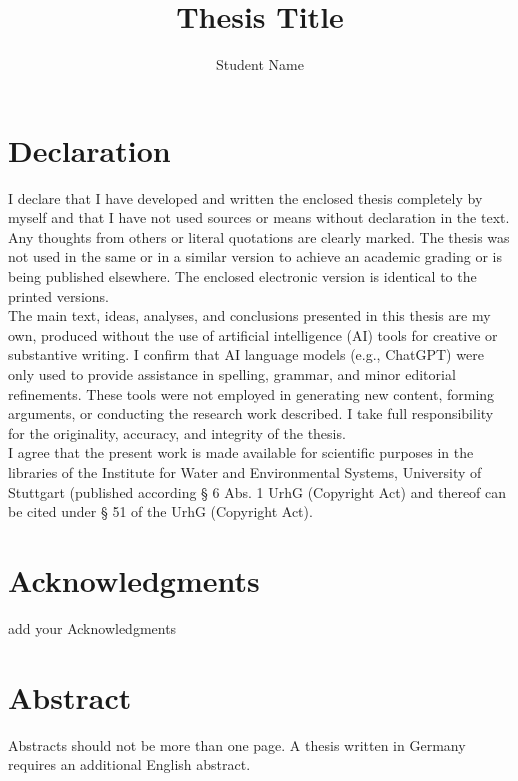 \documentclass[11pt,twoside]{thesis}
\title{\textbf{Thesis Title}} %
\author{Student Name} %
\begin{document}


\newpage\null\thispagestyle{empty}\newpage


\chapter*{Declaration}
{
	I declare that I have developed and written the enclosed thesis completely by myself and that I have not used sources or means without declaration in the text. Any thoughts from others or literal quotations are clearly marked. The thesis was not used in the same or in a similar version to achieve an academic grading or is being published elsewhere. The enclosed electronic version is identical to the printed versions.\\
	
	The main text, ideas, analyses, and conclusions presented in this thesis are my own, produced without the use of artificial intelligence (AI) tools for creative or substantive writing. I confirm that AI language models (e.g., ChatGPT) were only used to provide assistance in spelling, grammar, and minor editorial refinements. These tools were not employed in generating new content, forming arguments, or conducting the research work described. I take full responsibility for the originality, accuracy, and integrity of the thesis.\\ 
	
	I agree that the present work is made available for scientific purposes in the libraries of the Institute for Water and Environmental Systems, University of Stuttgart (published according § 6 Abs. 1 UrhG (Copyright Act) and thereof can be cited under § 51 of the UrhG (Copyright Act).
}

\chapter*{Acknowledgments}
{
add your Acknowledgments
}

\chapter*{Abstract}
{
Abstracts should not be more than one page. A thesis written in Germany requires an additional English abstract. 
}

\tableofcontents
\clearpage
\end{document}

